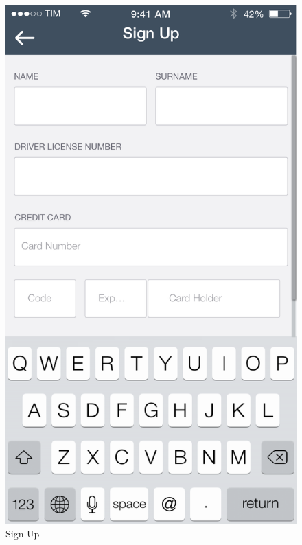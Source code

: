 \documentclass[12pt]{article}
\begin{document}
\begin{figure}
 	 	  \includegraphics[scale=0.25]{Images/mobileApp/Register.png}
		  \caption{Sign Up}
		  \endminipage
 	 	\end{figure}
 	 	
\end{document}
